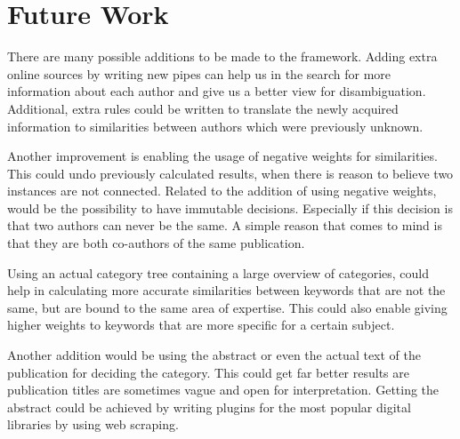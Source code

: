 \section{Future Work}

There are many possible additions to be made to the framework. Adding extra online sources by writing new pipes can help us in the search for more information about each author and give us a better view for disambiguation. Additional, extra rules could be written to translate the newly acquired information to similarities between authors which were previously unknown.

Another improvement is enabling the usage of negative weights for similarities. This could undo previously calculated results, when there is reason to believe two instances are not connected. Related to the addition of using negative weights, would be the possibility to have immutable decisions. Especially if this decision is that two authors can never be the same. A simple reason that comes to mind is that they are both co-authors of the same publication.

Using an actual category tree containing a large overview of categories, could help in calculating more accurate similarities between keywords that are not the same, but are bound to the same area of expertise. This could also enable giving higher weights to keywords that are more specific for a certain subject.

Another addition would be using the abstract or even the actual text of the publication for deciding the category. This could get far better results are publication titles are sometimes vague and open for interpretation. Getting the abstract could be achieved by writing plugins for the most popular digital libraries by using web scraping.

% 